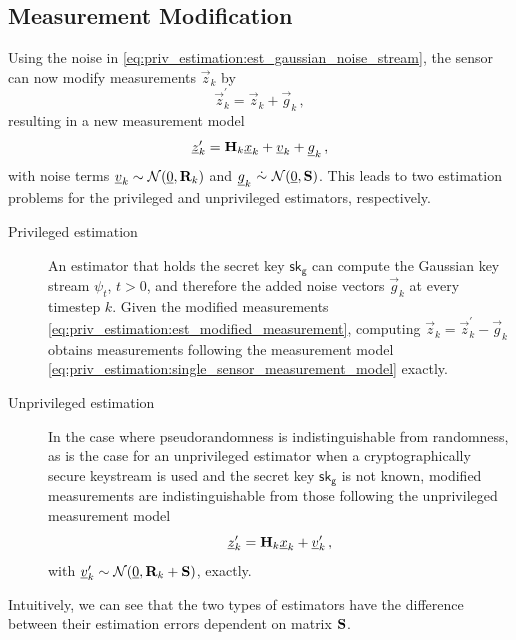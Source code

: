 \subsection{Measurement Modification}\label{subsec:priv_estimation:est_measurement_mod}
Using the noise in \eqref{eq:priv_estimation:est_gaussian_noise_stream}, the sensor can now modify measurements $\vec{z}_k$ by
\begin{equation}\label{eq:priv_estimation:est_modified_measurement}
    \vec{z}^\prime_k = \vec{z}_k + \vec{g}_k\,,
\end{equation}
resulting in a new measurement model
\begin{equation}
    {\underline{z}}^\prime_k = {{\mathbf{H}}}_k{\underline{x}}_k + {\underline{v}}_k + {\underline{g}}_k\,,
\end{equation}
with noise terms ${\underline{v}}_k\sim \mathcal{N}({\underline{0}},{{\mathbf{R}}}_k)$ and $\vec{g}_k\ \dot{\sim}\ \mathcal{N}(\vec{0},\mat{S})$. This leads to two estimation problems for the privileged and unprivileged estimators, respectively.
\begin{description}
    \item[Privileged estimation] An estimator that holds the secret key $\mathsf{sk}_{\mathsf{g}}$ can compute the Gaussian key stream $\psi_t$, $t>0$, and therefore the added noise vectors $\vec{g}_k$ at every timestep $k$. Given the modified measurements \eqref{eq:priv_estimation:est_modified_measurement}, computing $\vec{z}_k = \vec{z}^\prime_k - \vec{g}_k$  obtains measurements following the measurement model \eqref{eq:priv_estimation:single_sensor_measurement_model} exactly.
    \item[Unprivileged estimation] In the case where pseudorandomness is indistinguishable from randomness, as is the case for an unprivileged estimator when a cryptographically secure keystream is used and the secret key $\mathsf{sk}_{\mathsf{g}}$ is not known, modified measurements are indistinguishable from those following the unprivileged measurement model 
    \begin{equation}\label{eq:priv_estimation:est_unpriv_measurement_model}
        {\underline{z}}^\prime_k = {{\mathbf{H}}}_k{\underline{x}}_k + {\underline{v}}^\prime_k\,,
    \end{equation}
   with ${\underline{v}}^\prime_k\sim \mathcal{N}({\underline{0}},{{\mathbf{R}}}_k+{{\mathbf{S}}})$, exactly.
\end{description}

Intuitively, we can see that the two types of estimators have the difference between their estimation errors dependent on matrix ${{\mathbf{S}}}$.

